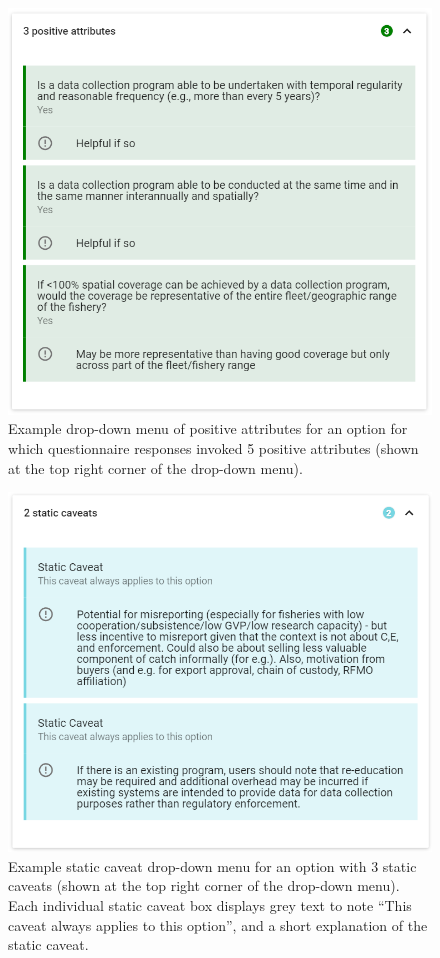 \documentclass[11pt,]{book}
\begin{document}
\begin{figure}

{\centering \includegraphics[width=0.75\linewidth]{images/pos-attr-drop-down} 

}

\caption{Example drop-down menu of positive attributes for an option for which questionnaire responses invoked 5 positive attributes (shown at the top right corner of the drop-down menu).}\label{fig:pos-attr-drop-down}
\end{figure}

\begin{figure}

{\centering \includegraphics[width=0.75\linewidth]{images/static-cav-drop-down} 

}

\caption{Example static caveat drop-down menu for an option with 3 static caveats (shown at the top right corner of the drop-down menu). Each individual static caveat box displays grey text to note “This caveat always applies to this option”, and a short explanation of the static caveat.}\label{fig:static-cav-drop-down}
\end{figure}
\end{document}
